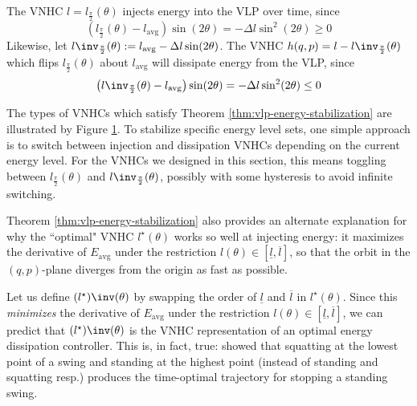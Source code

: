 \begin{cor}
   The VNHC \(l = l_\frac{\pi}{2}(\theta)\) injects energy into the VLP
   over time, since 
   \[
      \left(l_\frac{\pi}{2}(\theta) - l_\text{avg}\right)\sin(2\theta) = 
   -\Delta l \sin^2(2\theta) \geq 0
   \] 
   Likewise, let 
   \(l\inv_\frac{\pi}{2}(\theta) := l_\text{avg} - \Delta l \sin(2\theta)\).
    The VNHC \(h(q,p) = l - l\inv_\frac{\pi}{2}(\theta)\) which flips 
    \(l_\frac{\pi}{2}(\theta)\) about \(l_\text{avg}\) will dissipate energy from
   the VLP, since 
   \[
      \left(l\inv_\frac{\pi}{2}(\theta) - l_\text{avg}\right)\sin(2\theta) = 
      -\Delta l \sin^2(2\theta) \leq 0
   \] 
\end{cor}

The types of VNHCs which satisfy Theorem \ref{thm:vlp-energy-stabilization} are illustrated by Figure
\ref{fig:vlp-energy-in-out}. To stabilize specific energy level sets, one simple
approach is to switch between injection and dissipation VNHCs depending on the
current energy level.
For the VNHCs we designed in this section, this means toggling
between \(l_\frac{\pi}{2}(\theta)\) and \(l\inv_\frac{\pi}{2}(\theta)\),
possibly with some hysteresis to avoid infinite switching.  

\begin{figure}
   \centering
   \caption{}\label{fig:vlp-energy-in-out}
\end{figure}

Theorem \ref{thm:vlp-energy-stabilization} also provides an alternate
explanation for why the ``optimal" VNHC \(l^\star(\theta)\) works so well at
injecting energy: it maximizes the derivative of \(E_\text{avg}\) under the
restriction \(l(\theta) \in [\underline{l},\overline{l}]\), so that the orbit in the
\((q,p)\)-plane diverges from the origin as fast as possible. 

Let us define \((l^\star)\inv(\theta)\) by swapping the order of 
\(\underline{l}\) and \(\overline{l}\) in \(l^\star(\theta)\). Since this 
\textit{minimizes} the derivative of \(E_\text{avg}\) under the restriction
\(l(\theta) \in [\underline{l},\overline{l}]\), we can predict that 
\((l^\star)\inv(\theta)\) is the VNHC representation of an optimal 
energy dissipation controller.
This is, in fact, true: \cite{pumping_swing_standing_squatting} showed 
that squatting at the lowest point of a swing and standing at the highest
point (instead of standing and squatting resp.) produces the
time-optimal trajectory for stopping a standing swing. 


